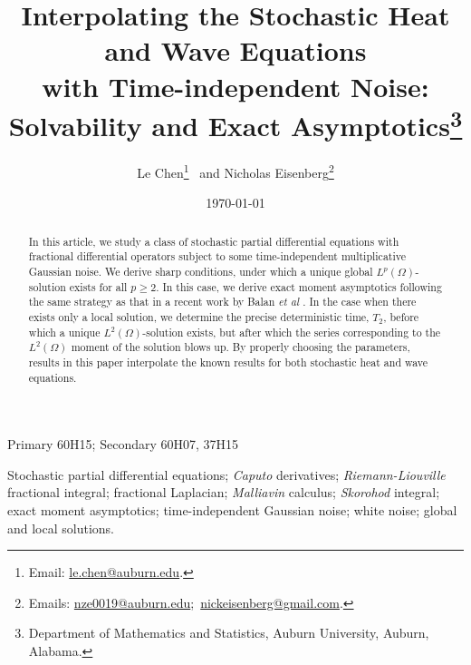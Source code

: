\documentclass[a4paper,11pt]{article}
\numberwithin{equation}{section}
\numberwithin{equation}{section}
\theoremstyle{plain}
\theoremstyle{definition}
\begin{document}
\title{Interpolating the Stochastic Heat and Wave Equations\\ with Time-independent Noise:\\
Solvability and Exact Asymptotics\footnote{Department of Mathematics and
Statistics, Auburn University, Auburn, Alabama.}}
\author{Le Chen\footnote{Email: \url{le.chen@auburn.edu}.}~
  and
Nicholas Eisenberg\footnote{Emails: \url{nze0019@auburn.edu};~\url{nickeisenberg@gmail.com}.}}
\date{\today}

\maketitle

\begin{abstract}
  \noindent In this article, we study a class of stochastic partial differential equations with
  fractional differential operators subject to some time-independent multiplicative Gaussian noise.
  We derive sharp conditions, under which a unique global $L^p(\Omega)$-solution exists for all
  $p\ge 2$. In this case, we derive exact moment asymptotics following the same strategy as that in
  a recent work by Balan {\it et al} \cite{BCC21}. In the case when there exists only a local
  solution, we determine the precise deterministic time, $T_2$, before which a unique
  $L^2(\Omega)$-solution exists, but after which the series corresponding to the $L^2(\Omega)$
  moment of the solution blows up. By properly choosing the parameters, results in this paper
  interpolate the known results for both stochastic heat and wave equations.
\end{abstract}

 Primary 60H15; Secondary 60H07, 37H15

\vspace{1mm}

Stochastic partial differential equations; {\it Caputo} derivatives; {\it Riemann-Liouville}
fractional integral; fractional Laplacian; {\it Malliavin} calculus; {\it Skorohod} integral; exact
moment asymptotics; time-independent Gaussian noise; white noise; global and local solutions.

\tableofcontents
\end{document}
